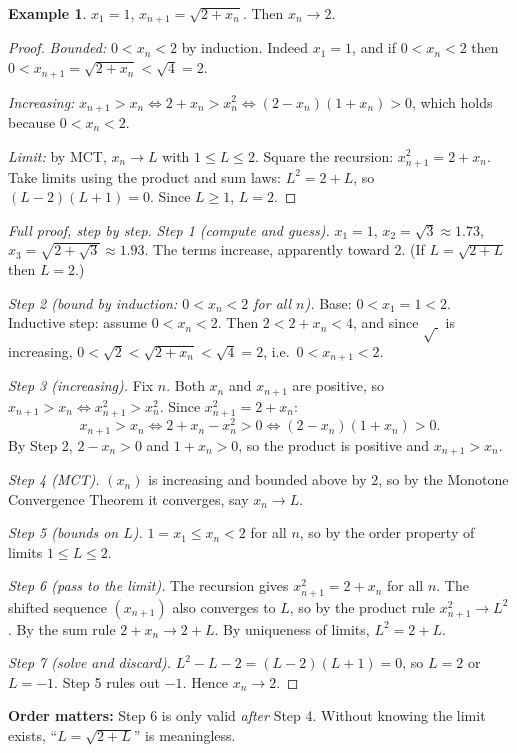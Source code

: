 \documentclass[11pt]{article}
\theoremstyle{definition}
\newtheorem{ex}[defn]{Example}
\newcommand{\key}[1]{\textcolor{red!70!black}{\textbf{#1}}}
\begin{document}
\begin{ex}
$x_1=1$, $x_{n+1}=\sqrt{2+x_n}$. Then $x_n\to2$.
\begin{proof}
\emph{Bounded:} $0<x_n<2$ by induction. Indeed $x_1=1$, and if
$0<x_n<2$ then $0<x_{n+1}=\sqrt{2+x_n}<\sqrt4=2$.

\emph{Increasing:} $x_{n+1}>x_n\iff 2+x_n>x_n^2\iff(2-x_n)(1+x_n)>0$, which
holds because $0<x_n<2$.

\emph{Limit:} by MCT, $x_n\to L$ with $1\le L\le2$. Square the recursion:
$x_{n+1}^2=2+x_n$. Take limits using the product and sum laws:
$L^2=2+L$, so $(L-2)(L+1)=0$. Since $L\ge1$, $L=2$.
\end{proof}

\begin{proof}[Full proof, step by step]
\emph{Step 1 (compute and guess).} $x_1=1$, $x_2=\sqrt3\approx1.73$,
$x_3=\sqrt{2+\sqrt3}\approx1.93$. The terms increase, apparently toward
$2$. (If $L=\sqrt{2+L}$ then $L=2$.)

\emph{Step 2 (bound by induction: $0<x_n<2$ for all $n$).}
Base: $0<x_1=1<2$. Inductive step: assume $0<x_n<2$. Then
$2<2+x_n<4$, and since $\sqrt{\ }$ is increasing,
$0<\sqrt2<\sqrt{2+x_n}<\sqrt4=2$, i.e.\ $0<x_{n+1}<2$.

\emph{Step 3 (increasing).} Fix $n$. Both $x_n$ and $x_{n+1}$ are
positive, so $x_{n+1}>x_n\iff x_{n+1}^2>x_n^2$. Since
$x_{n+1}^2=2+x_n$:
\[
x_{n+1}>x_n\iff2+x_n-x_n^2>0\iff(2-x_n)(1+x_n)>0.
\]
By Step 2, $2-x_n>0$ and $1+x_n>0$, so the product is positive and
$x_{n+1}>x_n$.

\emph{Step 4 (MCT).} $(x_n)$ is increasing and bounded above by $2$, so by
the Monotone Convergence Theorem it converges, say $x_n\to L$.

\emph{Step 5 (bounds on $L$).} $1=x_1\le x_n<2$ for all $n$, so by the
order property of limits $1\le L\le2$.

\emph{Step 6 (pass to the limit).} The recursion gives
$x_{n+1}^2=2+x_n$ for all $n$. The shifted sequence $(x_{n+1})$ also
converges to $L$, so by the product rule $x_{n+1}^2\to L^2$. By the sum
rule $2+x_n\to2+L$. By uniqueness of limits, $L^2=2+L$.

\emph{Step 7 (solve and discard).} $L^2-L-2=(L-2)(L+1)=0$, so $L=2$ or
$L=-1$. Step 5 rules out $-1$. Hence $x_n\to2$.
\end{proof}
\noindent\key{Order matters:} Step 6 is only valid \emph{after} Step 4.
Without knowing the limit exists, ``$L=\sqrt{2+L}$'' is meaningless.
\end{ex}
\end{document}
